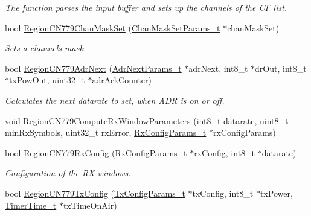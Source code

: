 \begin{DoxyCompactItemize}
\begin{DoxyCompactList}\small\item\em The function parses the input buffer and sets up the channels of the CF list. \end{DoxyCompactList}\item 
bool \mbox{\hyperlink{group___r_e_g_i_o_n_c_n779_ga06c5fe5ebbc02741394fb573944467b7}{Region\+C\+N779\+Chan\+Mask\+Set}} (\mbox{\hyperlink{group___r_e_g_i_o_n_ga6d24f7da136006410827dfb29f6b9b9e}{Chan\+Mask\+Set\+Params\+\_\+t}} $\ast$chan\+Mask\+Set)
\begin{DoxyCompactList}\small\item\em Sets a channels mask. \end{DoxyCompactList}\item 
bool \mbox{\hyperlink{group___r_e_g_i_o_n_c_n779_ga4c114db1d998a5ba77bb87ab34316ff8}{Region\+C\+N779\+Adr\+Next}} (\mbox{\hyperlink{group___r_e_g_i_o_n_ga567c2742622326b350b4e91bbf61b4ce}{Adr\+Next\+Params\+\_\+t}} $\ast$adr\+Next, int8\+\_\+t $\ast$dr\+Out, int8\+\_\+t $\ast$tx\+Pow\+Out, uint32\+\_\+t $\ast$adr\+Ack\+Counter)
\begin{DoxyCompactList}\small\item\em Calculates the next datarate to set, when A\+DR is on or off. \end{DoxyCompactList}\item 
void \mbox{\hyperlink{group___r_e_g_i_o_n_c_n779_ga4f354a88e5bfee44eccaad7d2e18c87e}{Region\+C\+N779\+Compute\+Rx\+Window\+Parameters}} (int8\+\_\+t datarate, uint8\+\_\+t min\+Rx\+Symbols, uint32\+\_\+t rx\+Error, \mbox{\hyperlink{group___r_e_g_i_o_n_ga375c038078dfcfc7ef14280021db719e}{Rx\+Config\+Params\+\_\+t}} $\ast$rx\+Config\+Params)
\item 
bool \mbox{\hyperlink{group___r_e_g_i_o_n_c_n779_ga89b2db72c7dd1dbaa07135d538e3c2fe}{Region\+C\+N779\+Rx\+Config}} (\mbox{\hyperlink{group___r_e_g_i_o_n_ga375c038078dfcfc7ef14280021db719e}{Rx\+Config\+Params\+\_\+t}} $\ast$rx\+Config, int8\+\_\+t $\ast$datarate)
\begin{DoxyCompactList}\small\item\em Configuration of the RX windows. \end{DoxyCompactList}\item 
bool \mbox{\hyperlink{group___r_e_g_i_o_n_c_n779_gae628efcfcba9afc2620f3c1234b90c3d}{Region\+C\+N779\+Tx\+Config}} (\mbox{\hyperlink{group___r_e_g_i_o_n_gabed730d4d04b0b60d4b6d1966d3f21d3}{Tx\+Config\+Params\+\_\+t}} $\ast$tx\+Config, int8\+\_\+t $\ast$tx\+Power, \mbox{\hyperlink{utilities_8h_a4215ca43d3e953099ea758ce428599d0}{Timer\+Time\+\_\+t}} $\ast$tx\+Time\+On\+Air)

\end{DoxyCompactItemize}
